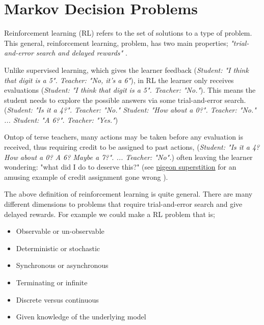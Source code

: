 \chapter{Markov Decision Problems}

Reinforcement learning (RL) refers to the set of solutions to a type of problem.
This general, reinforcement learning, problem, has two main properties;
\textit{"trial-and-error search and delayed rewards"} \cite{Sutton2018}.

Unlike supervised learning, which gives the learner feedback (\textit{Student: "I think that digit
is a 5". Teacher: "No, it's a 6"}), in RL the learner only receives evaluations (\textit{Student: "I think
that digit is a 5". Teacher: "No."}). This means the student needs to explore the possible answers via some trial-and-error search.
(\textit{Student: "Is it a 4?". Teacher: "No." Student: "How about a 0?". Teacher: "No." ... Student: "A 6?". Teacher: "Yes."})

Ontop of terse teachers, many actions may be taken before any evaluation is received, thus requiring credit to be assigned to past actions,
(\textit{Student: "Is it a 4? How about a 0? A 6? Maybe a 7?". ... Teacher: "No".})
often leaving the learner wondering: "what did I do to deserve this?" (see
\href{https://www.youtube.com/watch?v=Qv4H81gEGDQ}{pigeon superstition} for an amusing
example of credit assignment gone wrong \cite{Box1997}).


\vspace{5mm}

The above definition of reinforcement learning is quite general. There are many
different dimensions to problems that require trial-and-error search and give
delayed rewards. For example we could make a RL problem that is;

\begin{itemize}
\tightlist
\item
  Observable or un-observable \cite{Kaelbling1998}
\item
  Deterministic or stochastic \cite{Putterman2015}
\item
  Synchronous or asynchronous \cite{Bertsekas1995}
\item
  Terminating or infinite \cite{Putterman2015}
\item
  Discrete versus continuous \cite{Bertsekas1995}
\item
  Given knowledge of the underlying model \cite{Sutton1991}
\end{itemize}

